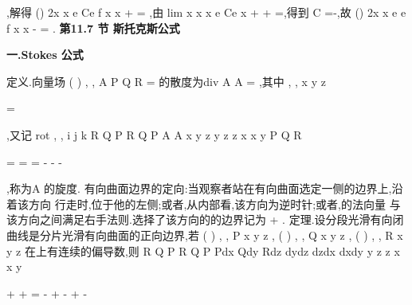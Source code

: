 ,解得
()
2x
x
e
Ce
f x
x
+
=
,由
lim
x
x
x
e
Ce
x
+
\to 
+
=,得到
C =-,故 
()
2x
x
e
e
f x
x
-
=
. 
\vspace{6pt}
{\large \bfseries \textcolor{lyred}{第11.7 节 斯托克斯公式}}

\vspace{4pt}
{\bfseries \textcolor{lyred}{一.Stokes 公式}}

\textcolor{lyred}{定义}.向量场
(
)
,
,
A
P Q R
=
\rho 
的散度为div A
A
=\nabla \cdots 
\rho 
\rho 
\rho 
,其中
,
,
x
y
z


\partial 
\partial 
\partial 
\nabla =

\partial 
\partial 
\partial 


\rho 
,又记 
rot
,
,
i
j
k
R
Q
P
R
Q
P
A
A
x
y
z
y
z
z
x
x
y
P
Q
R


\partial 
\partial 
\partial 
\partial 
\partial 
\partial 
\partial 
\partial 
\partial 
=\nabla \times 
=
=
-
-
-


\partial 
\partial 
\partial 
\partial 
\partial 
\partial 
\partial 
\partial 
\partial 


\rho 
\rho 
\rho 
\rho 
\rho 
\rho 
,称为A
\rho 
的\textcolor{lyred}{旋度}. 
\textcolor{lyred}{有向曲面边界的定向}:当观察者站在有向曲面\Sigma 选定一侧的边界上,沿着该方向 
行走时,\Sigma 位于他的左侧;或者,从\Sigma 内部看,该方向为逆时针;或者,\Sigma 的法向量 
与该方向之间满足右手法则.选择了该方向的\Sigma 的边界记为
+
\partial \Sigma . 
\textcolor{lyred}{定理}.设分段光滑有向闭曲线\Gamma 是分片光滑有向曲面\Sigma 的正向边界,若
(
)
, ,
P x y z , 
(
)
, ,
Q x y z ,
(
)
, ,
R x y z 在\Sigma 上有连续的偏导数,则 
R
Q
P
R
Q
P
Pdx
Qdy
Rdz
dydz
dzdx
dxdy
y
z
z
x
x
y
\Gamma 
\Sigma 




\partial 
\partial 
\partial 
\partial 
\partial 
\partial 


+
+
=
-
+
-
+
-






\partial 
\partial 
\partial 
\partial 
\partial 
\partial 






